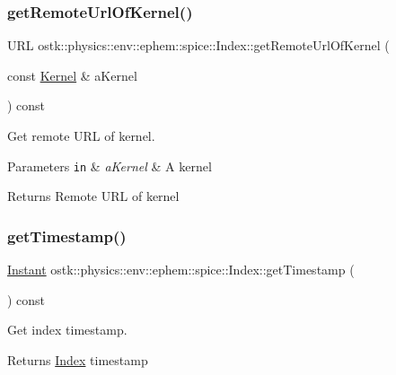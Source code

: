 \subsubsection{\texorpdfstring{get\+Remote\+Url\+Of\+Kernel()}{getRemoteUrlOfKernel()}}
{\footnotesize\ttfamily U\+RL ostk\+::physics\+::env\+::ephem\+::spice\+::\+Index\+::get\+Remote\+Url\+Of\+Kernel (\begin{DoxyParamCaption}\item[{const \hyperlink{classostk_1_1physics_1_1env_1_1ephem_1_1spice_1_1_kernel}{Kernel} \&}]{a\+Kernel }\end{DoxyParamCaption}) const}



Get remote U\+RL of kernel. 


\begin{DoxyParams}[1]{Parameters}
\mbox{\tt in}  & {\em a\+Kernel} & A kernel \\
\hline
\end{DoxyParams}
\begin{DoxyReturn}{Returns}
Remote U\+RL of kernel 
\end{DoxyReturn}
\mbox{\label{classostk_1_1physics_1_1env_1_1ephem_1_1spice_1_1_index_ac9084f3d77dbe04d460ee335907fab83}} 
\subsubsection{\texorpdfstring{get\+Timestamp()}{getTimestamp()}}
{\footnotesize\ttfamily \hyperlink{classostk_1_1physics_1_1time_1_1_instant}{Instant} ostk\+::physics\+::env\+::ephem\+::spice\+::\+Index\+::get\+Timestamp (\begin{DoxyParamCaption}{ }\end{DoxyParamCaption}) const}



Get index timestamp. 

\begin{DoxyReturn}{Returns}
\hyperlink{classostk_1_1physics_1_1env_1_1ephem_1_1spice_1_1_index}{Index} timestamp 
\end{DoxyReturn}
\mbox{\label{classostk_1_1physics_1_1env_1_1ephem_1_1spice_1_1_index_a4c94c88d8e3fe896eaaa2baa1c0b3bb8}} 
